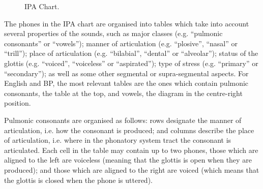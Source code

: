 \begin{figure}[!ht]
        \noindent{}
        \caption{IPA Chart.}\label{fig:ipa-chart}
\end{figure}


The phones in the \ac{IPA} chart are organised into tables which take into account several properties of the sounds, such as major classes (e.g. ``pulmonic consonants'' or ``vowels''); manner of articulation (e.g. ``plosive'', ``nasal'' or ``trill''); place of articulation (e.g. ``bilabial'', ``dental'' or ``alveolar''); status of the glottis (e.g. ``voiced'', ``voiceless'' or ``aspirated''); type of stress (e.g. ``primary'' or ``secondary''); as well as some other segmental or supra-segmental aspects. For English and \gls{BP}, the most relevant tables are the ones which contain pulmonic consonants, the table at the top, and vowels, the diagram in the centre-right position. 

Pulmonic consonants are organised as follows: rows designate the manner of articulation, i.e. how the consonant is produced; and columns describe the place of articulation, i.e. where in the phonatory system tract the consonant is articulated. Each cell in the table may contain up to two phones, those which are aligned to the left are voiceless (meaning that the glottis is open when they are produced); and those which are aligned to the right are voiced (which means that the glottis is closed when the phone is uttered). 


